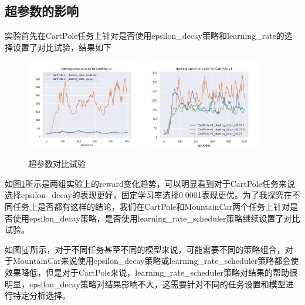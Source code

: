\documentclass[a4paper]{ctexart}
\begin{document}
\subsection{超参数的影响}
实验首先在CartPole任务上针对是否使用epsilon\_decay策略和learning\_rate的选择设置了对比试验，结果如下
\begin{figure}[H]
    \centering
    \includegraphics[width=0.46\textwidth]{train3.jpg}
    \includegraphics[width=0.46\textwidth]{train4.jpg}
    \caption{超参数对比试验}
    \label{c}
\end{figure}
如图\ref{c}所示是两组实验上的reward变化趋势，可以明显看到对于CartPole任务来说选择epsilon\_decay的表现更好，固定学习率选择0.0001表现更优。为了我探究在不同任务上是否都有这样的结论，我们在CartPole和MountainCar两个任务上针对是否使用epsilon\_decay策略，是否使用learning\_rate\_scheduler策略继续设置了对比试验。

如图\ref{d}所示，对于不同任务甚至不同的模型来说，可能需要不同的策略组合，对于MountainCar来说使用epsilon\_decay策略或learning\_rate\_scheduler策略都会使效果降低，但是对于CartPole来说，learning\_rate\_scheduler策略对结果的帮助很明显，epsilon\_decay策略对结果影响不大，这需要针对不同的任务设置和模型进行特定分析选择。
\end{document}
